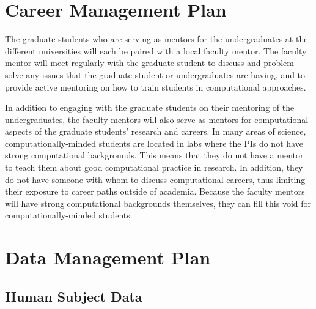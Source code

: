 \documentclass{proposalnsf}
\begin{document}
\section{Career Management Plan}

The graduate students who are serving as mentors for the
undergraduates at the different universities will each be paired with
a local faculty mentor. The faculty mentor will meet regularly with
the graduate student to discuss and problem solve any issues that the
graduate student or undergraduates are having, and to provide active
mentoring on how to train students in computational approaches.

In addition to engaging with the graduate students on their mentoring
of the undergraduates, the faculty mentors will also serve as
mentors for computational aspects of the graduate students' research
and careers. In many areas of science, computationally-minded students
are located in labs where the PIs do not have strong computational
backgrounds. This means that they do not have a mentor to teach them
about good computational practice in research. In addition, they do
not have someone with whom to discuss computational careers, thus limiting
their exposure to career paths outside of academia. Because the
faculty mentors will have strong computational backgrounds themselves,
they can fill this void for computationally-minded students.



\appendix

\newpage
{}
\renewcommand{\thepage} {\footnotesize References\,---\,\arabic{page}}





\newpage
{}
\renewcommand{\thepage} {\footnotesize Data Management\,---\,\arabic{page}}

\section*{Data Management Plan}

\subsection*{Human Subject Data}
\end{document}
